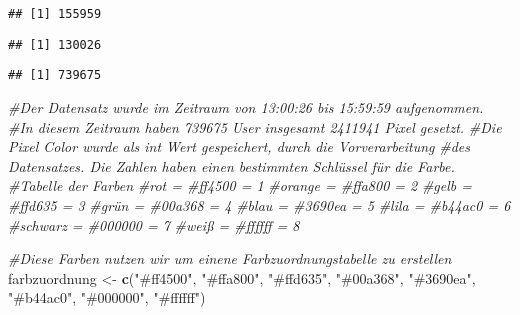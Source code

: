 \documentclass[
]{article}
\newenvironment{Shaded}{\begin{snugshade}}{\end{snugshade}}
\newcommand{\CommentTok}[1]{\textcolor[rgb]{0.56,0.35,0.01}{\textit{#1}}}
\newcommand{\FunctionTok}[1]{\textcolor[rgb]{0.13,0.29,0.53}{\textbf{#1}}}
\newcommand{\NormalTok}[1]{#1}
\newcommand{\OtherTok}[1]{\textcolor[rgb]{0.56,0.35,0.01}{#1}}
\newcommand{\SpecialCharTok}[1]{\textcolor[rgb]{0.81,0.36,0.00}{\textbf{#1}}}
\newcommand{\StringTok}[1]{\textcolor[rgb]{0.31,0.60,0.02}{#1}}
\begin{document}
\begin{verbatim}
## [1] 155959
\end{verbatim}

\begin{Shaded}
\end{Shaded}

\begin{verbatim}
## [1] 130026
\end{verbatim}

\begin{Shaded}
\end{Shaded}

\begin{verbatim}
## [1] 739675
\end{verbatim}

\begin{Shaded}
\begin{Highlighting}[]
\CommentTok{\#Der Datensatz wurde im Zeitraum von 13:00:26 bis 15:59:59 aufgenommen.}
\CommentTok{\#In diesem Zeitraum haben 739675 User insgesamt 2411941 Pixel gesetzt.}
\CommentTok{\#Die Pixel Color wurde als int Wert gespeichert, durch die Vorverarbeitung}
\CommentTok{\#des Datensatzes. Die Zahlen haben einen bestimmten Schlüssel für die Farbe.}
\CommentTok{\#Tabelle der Farben}
\CommentTok{\#rot = \#ff4500 = 1}
\CommentTok{\#orange = \#ffa800 = 2}
\CommentTok{\#gelb = \#ffd635  = 3}
\CommentTok{\#grün = \#00a368 = 4}
\CommentTok{\#blau = \#3690ea = 5}
\CommentTok{\#lila = \#b44ac0 = 6}
\CommentTok{\#schwarz = \#000000 = 7}
\CommentTok{\#weiß = \#ffffff = 8}
\end{Highlighting}
\end{Shaded}

\begin{Shaded}
\begin{Highlighting}[]
\CommentTok{\#Diese Farben nutzen wir um einene Farbzuordnungstabelle zu erstellen}
\NormalTok{farbzuordnung }\OtherTok{\textless{}{-}} \FunctionTok{c}\NormalTok{(}\StringTok{"\#ff4500"}\NormalTok{, }\StringTok{"\#ffa800"}\NormalTok{, }\StringTok{"\#ffd635"}\NormalTok{, }\StringTok{"\#00a368"}\NormalTok{,}
                \StringTok{"\#3690ea"}\NormalTok{, }\StringTok{"\#b44ac0"}\NormalTok{, }\StringTok{"\#000000"}\NormalTok{, }\StringTok{"\#ffffff"}\NormalTok{)}
\end{Highlighting}
\end{Shaded}
\end{document}
